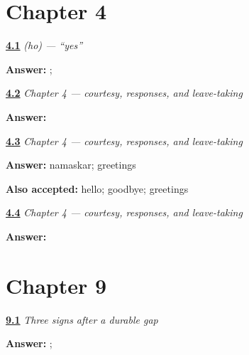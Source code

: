 \section*{Chapter 4}

\noindent\begin{minipage}[t]{\linewidth}
\raggedright
\hyperlink{review-MR-C01-ho-script-r2-c}{\textbf{4.1}} \emph{ (ho) — \textquotedblleft{}yes\textquotedblright{}}\par
\small \textbf{Answer:} ;   \par
\end{minipage}\par\medskip

\noindent\begin{minipage}[t]{\linewidth}
\raggedright
\hyperlink{review-MR-C01-practice-writing-ho}{\textbf{4.2}} \emph{Chapter 4 — courtesy, responses, and leave-taking}\par
\small \textbf{Answer:} \par
\end{minipage}\par\medskip

\noindent\begin{minipage}[t]{\linewidth}
\raggedright
\hyperlink{review-MR-C01-practice-read-namaskar}{\textbf{4.3}} \emph{Chapter 4 — courtesy, responses, and leave-taking}\par
\small \textbf{Answer:} namaskar; greetings\par
\footnotesize \textbf{Also accepted:} hello; goodbye; greetings
\end{minipage}\par\medskip

\noindent\begin{minipage}[t]{\linewidth}
\raggedright
\hyperlink{review-MR-C01-practice-script-r2-d}{\textbf{4.4}} \emph{Chapter 4 — courtesy, responses, and leave-taking}\par
\small \textbf{Answer:}   \par
\end{minipage}\par\medskip

\section*{Chapter 9}

\noindent\begin{minipage}[t]{\linewidth}
\raggedright
\hyperlink{review-MR-R09-script-a-r3-check}{\textbf{9.1}} \emph{Three signs after a durable gap}\par
\small \textbf{Answer:} ;   \par
\end{minipage}\par\medskip

